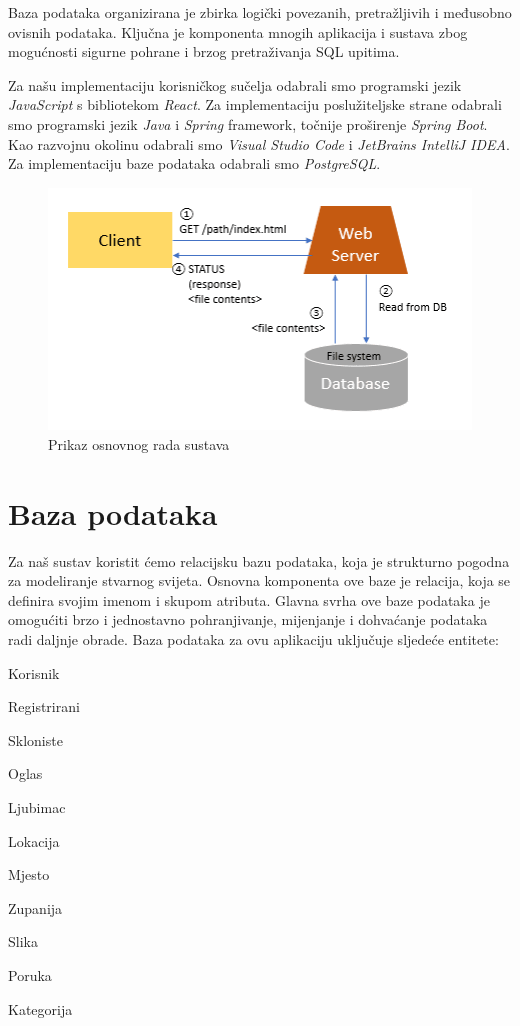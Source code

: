 \begingroup
Baza podataka organizirana je zbirka logički povezanih, pretražljivih i međusobno ovisnih podataka. Ključna je komponenta mnogih aplikacija i sustava zbog mogućnosti sigurne pohrane i brzog pretraživanja SQL upitima.
\endgroup

\begingroup
Za našu implementaciju korisničkog sučelja odabrali smo programski jezik \textit{JavaScript} s bibliotekom \textit{React}. Za implementaciju poslužiteljske strane odabrali smo programski jezik \textit{Java} i \textit{Spring} framework, točnije proširenje \textit{Spring Boot}. Kao razvojnu okolinu odabrali smo \textit{Visual Studio Code} i \textit{JetBrains IntelliJ IDEA}. Za implementaciju baze podataka odabrali smo \textit{PostgreSQL}.
\endgroup

\begin{figure}[h]
	\centering
	\includegraphics[width=1\textwidth]{slike/client-server-db.png}
	\caption{Prikaz osnovnog rada sustava}
	\label{fig:mesh1}
\end{figure}

\pagebreak

\section{Baza podataka}

\noindent Za naš sustav koristit ćemo relacijsku bazu podataka, koja je strukturno pogodna za modeliranje stvarnog svijeta. Osnovna komponenta ove baze je relacija, koja se definira svojim imenom i skupom atributa. Glavna svrha ove baze podataka je omogućiti brzo i jednostavno pohranjivanje, mijenjanje i dohvaćanje podataka radi daljnje obrade. Baza podataka za ovu aplikaciju uključuje sljedeće entitete:

\begin{packed_item}

	\item Korisnik
	\item Registrirani
	\item Skloniste
	\item Oglas
	\item Ljubimac
	\item Lokacija
	\item Mjesto
	\item Zupanija
	\item Slika
	\item Poruka
	\item Kategorija

\end{packed_item}

